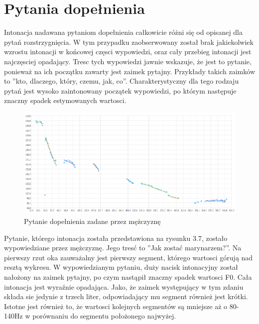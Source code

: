 \documentclass[a4paper,12 pt]{report}
\begin{document}
\section{Pytania dopełnienia}
Intonacja nadawana pytaniom dopełnienia całkowicie różni się od opisanej dla pytań rozstrzygnięcia. W tym przypadku zaobserwowany został brak jakiekolwiek wzrostu intonacji w końcowej częsci wypowiedzi, oraz cały przebieg intonacji jest najczęsciej opadający. Tresc tych wypowiedzi jawnie wskazuje, że jest to pytanie, ponieważ na ich początku zawarty jest zaimek pytajny. Przykłady takich zaimków to ''kto, dlaczego, który, czemu, jak, co''. Charakterystyczny dla tego rodzaju pytań jest wysoko zaintonowany początek wypowiedzi,  po którym następuje znaczny spadek estymowanych wartosci.
 \FloatBarrier
\begin{figure}[h]
\centering
\includegraphics[scale=0.85]{pytanie_uzupelnienia_marynarz.pdf}
\caption{Pytanie dopełnienia zadane przez mężczyznę}
\end{figure}
\FloatBarrier
Pytanie, którego intonacja została przedstawiona na rysunku 3.7, zostało wypowiedziane przez mężczyznę. Jego tresć to ''Jak zostać marynarzem?''. Na pierwszy rzut oka zauważalny jest pierwszy segment, którego wartosci górują nad resztą wykresu. W wypowiedzianym pytaniu, duży nacisk intonacyjny został nałożony na zaimek pytajny, po czym nastąpił znaczny spadek wartosci F0. Cała intonacja jest wyraźnie opadająca. Jako, że zaimek występujący w tym zdaniu składa sie jedynie z trzech liter, odpowiadający mu segment również jest krótki. Istotne jest również to, że wartosci kolejnych segmentów są mniejsze aż o 80-140Hz w porównaniu do segmentu położonego najwyżej.
\end{document}
